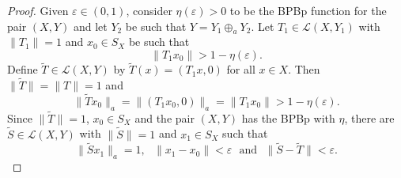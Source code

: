 \documentclass[10pt,a4paper]{amsart}
\theoremstyle{plain}
\theoremstyle{definition}
\newcommand{\eps}{\varepsilon}
\begin{document}
\begin{proof} Given $\eps \in (0 , 1)$, consider $\eta (\eps) > 0$ to be the BPBp function for the pair $(X, Y)$ and let $Y_2$ be such that $Y = Y_1 \oplus_a Y_2$. Let $T_1 \in \mathcal{L}(X, Y_1)$ with $\|T_1\| = 1$ and $x_0 \in S_X$ be such that
\begin{equation*}
\|T_1x_0\| > 1 - \eta (\eps).
\end{equation*}
Define $\widetilde{T} \in \mathcal{L}(X, Y)$ by $\widetilde{T}(x) = (T_1x, 0)$ for all $x \in X$. Then $\|\widetilde{T}\| = \|T\| = 1$ and
\begin{equation*}
\|\widetilde{T} x_0\|_a = \|(T_1 x_0, 0)\|_a = \|T_1 x_0\| > 1 - \eta (\eps).
\end{equation*}
Since $\|\widetilde{T}\| = 1$, $x_0 \in S_X$ and the pair $(X, Y)$ has the BPBp with $\eta$, there are $\widetilde{S} \in \mathcal{L}(X, Y)$ with $\|\widetilde{S}\| = 1$ and $x_1 \in S_X$ such that 
\begin{equation*}
\| \widetilde{S}x_1\|_a = 1, \ \ \ \|x_1 - x_0\| < \eps \ \ \ \mbox{and} \ \ \ \|\widetilde{S} - \widetilde{T} \| < \eps.
\end{equation*}


\end{proof}
\end{document}
